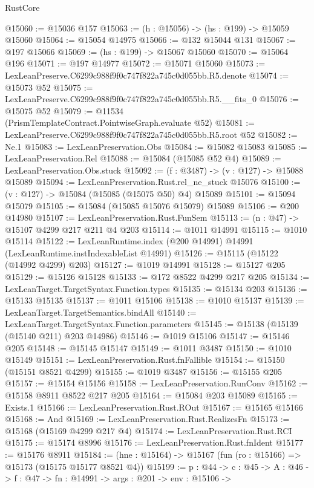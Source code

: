 \begin{lexlean}{RustCore}
\begin{coremodule}
@15060 := @15036 @157
@15063 := (h : @15056) -> (hs : @199) -> @15059 @15060
@15064 := @15054 @14975
@15066 := @132 @15044 @131
@15067 := @197 @15066
@15069 := (hs : @199) -> @15067 @15060
@15070 := @15064 @196
@15071 := @197 @14977
@15072 := @15071 @15060
@15073 := LexLeanPreserve.C6299c988f9f0c747f822a745c0d055bb.R5.denote
@15074 := @15073 @52
@15075 := LexLeanPreserve.C6299c988f9f0c747f822a745c0d055bb.R5.__fits_0
@15076 := @15075 @52
@15079 := @11534 (PrismTemplateContract.PointwiseGraph.evaluate @52)
@15081 := LexLeanPreserve.C6299c988f9f0c747f822a745c0d055bb.R5.root @52
@15082 := Ne.{1}
@15083 := LexLeanPreservation.Obs
@15084 := @15082 @15083
@15085 := LexLeanPreservation.Rel
@15088 := @15084 (@15085 @52 @4)
@15089 := LexLeanPreservation.Obs.stuck
@15092 := (f : @3487) -> (v : @127) -> @15088 @15089
@15094 := LexLeanPreservation.Rust.rel_ne_stuck @15076
@15100 := (v : @127) -> @15084 (@15085 (@15075 @50) @4) @15089
@15101 := @15094 @15079
@15105 := @15084 (@15085 @15076 @15079) @15089
@15106 := @200 @14980
@15107 := LexLeanPreservation.Rust.FunSem
@15113 := (n : @47) -> @15107 @4299 @217 @211 @4 @203
@15114 := @1011 @14991
@15115 := @1010 @15114
@15122 := LexLeanRuntime.index (@200 @14991) @14991 (LexLeanRuntime.instIndexableList @14991)
@15126 := @15115 (@15122 (@14992 @4299) @203)
@15127 := @1019 @14991
@15128 := @15127 @205
@15129 := @15126 @15128
@15133 := @172 @8522 @4299 @217 @205
@15134 := LexLeanTarget.TargetSyntax.Function.types
@15135 := @15134 @203
@15136 := @15133 @15135
@15137 := @1011 @15106
@15138 := @1010 @15137
@15139 := LexLeanTarget.TargetSemantics.bindAll
@15140 := LexLeanTarget.TargetSyntax.Function.parameters
@15145 := @15138 (@15139 (@15140 @211) @203 @14986)
@15146 := @1019 @15106
@15147 := @15146 @205
@15148 := @15145 @15147
@15149 := @1011 @3487
@15150 := @1010 @15149
@15151 := LexLeanPreservation.Rust.fnFallible
@15154 := @15150 (@15151 @8521 @4299)
@15155 := @1019 @3487
@15156 := @15155 @205
@15157 := @15154 @15156
@15158 := LexLeanPreservation.RunConv
@15162 := @15158 @8911 @8522 @217 @205
@15164 := @15084 @203 @15089
@15165 := Exists.{1}
@15166 := LexLeanPreservation.Rust.ROut
@15167 := @15165 @15166
@15168 := And
@15169 := LexLeanPreservation.Rust.RealizesFn
@15173 := @15168 (@15169 @4299 @217 @4)
@15174 := LexLeanPreservation.Rust.RCI
@15175 := @15174 @8996
@15176 := LexLeanPreservation.Rust.fnIdent
@15177 := @15176 @8911
@15184 := (hne : @15164) -> @15167 (fun (ro : @15166) => @15173 (@15175 @15177 @8521 @4))
@15199 := {p : @44} ->
  {c : @45} ->
  {A : @46} ->
  {f : @47} ->
  {fn : @14991} ->
  {args : @201} ->
  {env : @15106} ->

\end{coremodule}
\end{lexlean}
